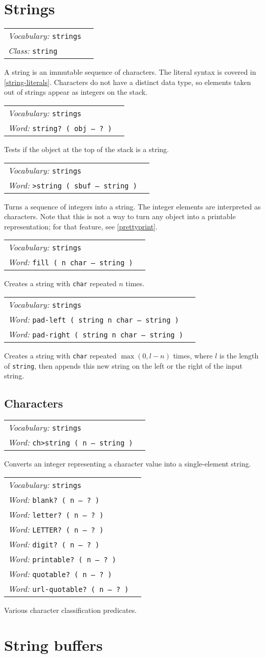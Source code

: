 \documentclass{book}
\newcommand{\vocabulary}[1]{\emph{Vocabulary:} \texttt{#1}&\\}
\newcommand{\ordinaryword}[2]{\index{\texttt{#1}}\emph{Word:} \texttt{#2}&\\}
\newcommand{\classword}[1]{\index{\texttt{#1}}\emph{Class:} \texttt{#1}&\\}
\newcommand{\wordtable}[1]{


\begin{tabularx}{12cm}{lX}
\hline
#1
\hline
\end{tabularx}

}
\begin{document}
\section{Strings}\label{strings}

\stringglos
\wordtable{
\vocabulary{strings}
\classword{string}
}
A string is an immutable sequence of characters. The literal syntax is covered in \ref{string-literals}. Characters do not have a distinct data type, so elements taken out of strings appear as integers on the stack.

\wordtable{
\vocabulary{strings}
\ordinaryword{string?}{string?~( obj -- ?~)}

}
Tests if the object at the top of the stack is a string.

\wordtable{
\vocabulary{strings}
\ordinaryword{>string}{>string~( sbuf -- string )}
}
Turns a sequence of integers into a string. The integer elements are interpreted as characters. Note that this is not a way to turn any object into a printable representation; for that feature, see \ref{prettyprint}.

\wordtable{
\vocabulary{strings}
\ordinaryword{fill}{fill~( n char -- string )}

}
Creates a string with \texttt{char} repeated $n$ times.
\wordtable{
\vocabulary{strings}
\ordinaryword{pad-left}{pad-left~( string n char -- string )}
\ordinaryword{pad-right}{pad-right~( string n char -- string )}

}
Creates a string with \texttt{char} repeated $\max(0,l-n)$ times, where $l$ is the length of \texttt{string}, then appends this new string on the left or the right of the input string.

\subsection{Characters}

\wordtable{
\vocabulary{strings}
\ordinaryword{ch>string}{ch>string ( n -- string )}
}
Converts an integer representing a character value into a single-element string.
\wordtable{
\vocabulary{strings}
\ordinaryword{blank?}{blank?~( n -- ?~)}
\ordinaryword{letter?}{letter?~( n -- ?~)}
\ordinaryword{LETTER?}{LETTER?~( n -- ?~)}
\ordinaryword{digit?}{digit?~( n -- ?~)}
\ordinaryword{printable?}{printable?~( n -- ?~)}
\ordinaryword{quotable?}{quotable?~( n -- ?~)}
\ordinaryword{url-quotable?}{url-quotable?~( n -- ?~)}
}
Various character classification predicates.

\section{String buffers}\label{string-buffers}
\end{document}
